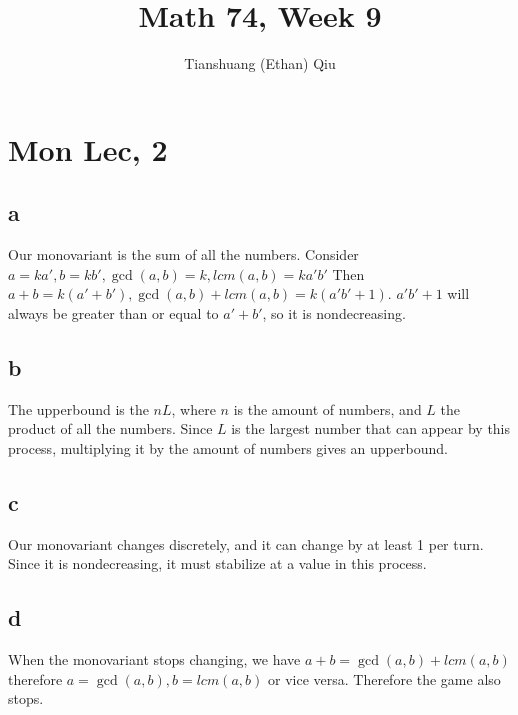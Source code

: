 \documentclass[12pt]{article}
\author{Tianshuang (Ethan) Qiu}
\begin{document}
\title{Math 74, Week 9}
\maketitle

\section{Mon Lec, 2}

\subsection{a}
Our monovariant is the sum of all the numbers. Consider $a = ka', b = kb', \gcd(a,b) = k, lcm(a,b) = ka'b'$ Then $a+b = k(a'+b'), \gcd(a,b) +lcm(a,b) = k(a'b'+1)$. $a'b' + 1$ will always be greater than or equal to $a' + b'$, so it is nondecreasing.

\subsection{b}
The upperbound is the $nL$, where $n$ is the amount of numbers, and $L$ the product of all the numbers. Since $L$ is the largest number that can appear by this process, multiplying it by the amount of numbers gives an upperbound.

\subsection{c}
Our monovariant changes discretely, and it can change by at least 1 per turn. Since it is nondecreasing, it must stabilize at a value in this process.

\subsection{d}
When the monovariant stops changing, we have $a+b = \gcd(a,b) +lcm(a,b)$ therefore $a = \gcd(a,b), b = lcm(a,b)$ or vice versa. Therefore the game also stops.
\end{document}
